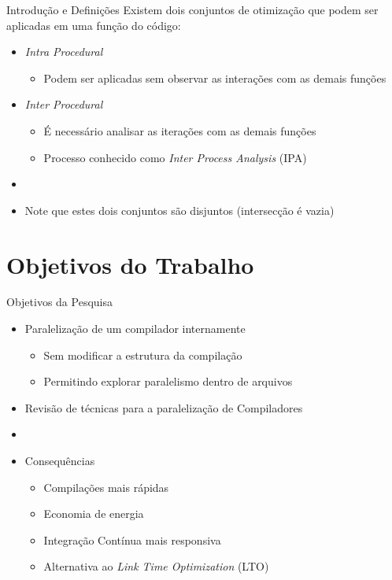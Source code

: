 \begin{frame}{Introdução e Definições}
    Existem dois conjuntos de otimização que podem ser aplicadas em uma função do código:
  \begin{itemize}
    \item \textit{Intra Procedural}
        \begin{itemize}
            \item Podem ser aplicadas sem observar as interações com as demais funções
        \end{itemize}
    \item \textit{Inter Procedural}
        \begin{itemize}
            \item É necessário analisar as iterações com as demais funções
            \item Processo conhecido como \textit{Inter Process Analysis} (IPA)
        \end{itemize}
    \item[]
    \item Note que estes dois conjuntos são disjuntos (intersecção é vazia)
  \end{itemize}
\end{frame}

\section{Objetivos do Trabalho}

\begin{frame}{Objetivos da Pesquisa}
    \begin{itemize}
        \item Paralelização de um compilador internamente
        \begin{itemize}
            \item Sem modificar a estrutura da compilação
            \item Permitindo explorar paralelismo dentro de arquivos
        \end{itemize}
        \item Revisão de técnicas para a paralelização de Compiladores
        \item[]
        \item Consequências
        \begin{itemize}
            \item Compilações mais rápidas
            \item Economia de energia
            \item Integração Contínua mais responsiva
            \item Alternativa ao \textit{Link Time Optimization} (LTO)
        \end{itemize}
    \end{itemize}
\end{frame}

